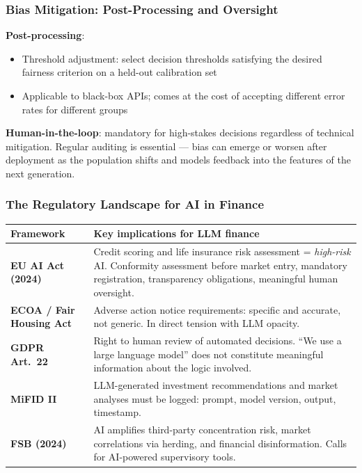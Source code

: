 \documentclass[9pt,t]{beamer}
\begin{document}
\begin{frame}
\frametitle{Bias Mitigation: Post-Processing and Oversight}

\textbf{Post-processing}:
\begin{itemize}
  \item Threshold adjustment: select decision thresholds satisfying the desired fairness criterion on a held-out calibration set
  \item Applicable to black-box APIs; comes at the cost of accepting different error rates for different groups
\end{itemize}

\medskip
\textbf{Human-in-the-loop}: mandatory for high-stakes decisions regardless of technical mitigation. Regular auditing is essential — bias can emerge or worsen after deployment as the population shifts and models feedback into the features of the next generation.
\end{frame}

\begin{frame}
\frametitle{The Regulatory Landscape for AI in Finance}

\begin{center}
\small
\begin{tabular}{lp{8cm}}
\toprule
\textbf{Framework} & \textbf{Key implications for LLM finance} \\
\midrule
\textbf{EU AI Act (2024)} & Credit scoring and life insurance risk assessment = \emph{high-risk} AI. Conformity assessment before market entry, mandatory registration, transparency obligations, meaningful human oversight. \\[6pt]
\textbf{ECOA / Fair Housing Act} & Adverse action notice requirements: specific and accurate, not generic. In direct tension with LLM opacity. \\[6pt]
\textbf{GDPR Art.~22} & Right to human review of automated decisions. ``We use a large language model'' does not constitute meaningful information about the logic involved. \\[6pt]
\textbf{MiFID II} & LLM-generated investment recommendations and market analyses must be logged: prompt, model version, output, timestamp. \\[6pt]
\textbf{FSB (2024)} & AI amplifies third-party concentration risk, market correlations via herding, and financial disinformation. Calls for AI-powered supervisory tools. \\
\bottomrule
\end{tabular}
\end{center}
\end{frame}
\end{document}
